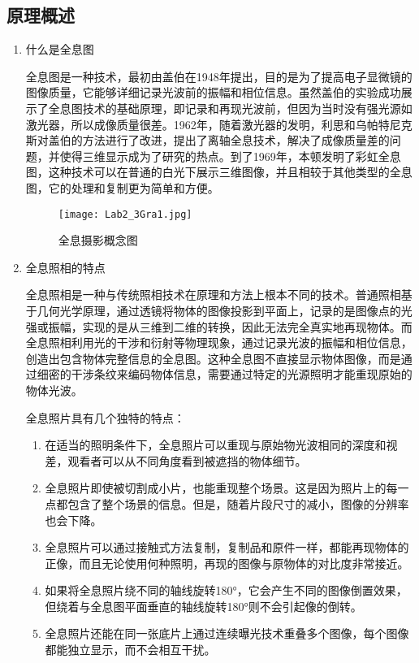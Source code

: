 \documentclass[dvipsnames, svgnames,a4paper,11pt]{article}
\begin{document}
	\subsection{原理概述}
	\begin{enumerate}
		\item 什么是全息图
		
		全息图是一种技术，最初由盖伯在1948年提出，目的是为了提高电子显微镜的图像质量，它能够详细记录光波前的振幅和相位信息。虽然盖伯的实验成功展示了全息图技术的基础原理，即记录和再现光波前，但因为当时没有强光源如激光器，所以成像质量很差。1962年，随着激光器的发明，利思和乌帕特尼克斯对盖伯的方法进行了改进，提出了离轴全息技术，解决了成像质量差的问题，并使得三维显示成为了研究的热点。到了1969年，本顿发明了彩虹全息图，这种技术可以在普通的白光下展示三维图像，并且相较于其他类型的全息图，它的处理和复制更为简单和方便。
		
		\begin{figure}[htbp]
			\centering
			\texttt{[image: Lab2\_3Gra1.jpg]}
			\caption{全息摄影概念图}
			\label{fig:fig1}
		\end{figure}
		
		\item 全息照相的特点
		
		全息照相是一种与传统照相技术在原理和方法上根本不同的技术。普通照相基于几何光学原理，通过透镜将物体的图像投影到平面上，记录的是图像点的光强或振幅，实现的是从三维到二维的转换，因此无法完全真实地再现物体。而全息照相利用光的干涉和衍射等物理现象，通过记录光波的振幅和相位信息，创造出包含物体完整信息的全息图。这种全息图不直接显示物体图像，而是通过细密的干涉条纹来编码物体信息，需要通过特定的光源照明才能重现原始的物体光波。
		
		全息照片具有几个独特的特点：
		\begin{enumerate}
			\item 在适当的照明条件下，全息照片可以重现与原始物光波相同的深度和视差，观看者可以从不同角度看到被遮挡的物体细节。
			\item 全息照片即使被切割成小片，也能重现整个场景。这是因为照片上的每一点都包含了整个场景的信息。但是，随着片段尺寸的减小，图像的分辨率也会下降。
			\item 全息照片可以通过接触式方法复制，复制品和原件一样，都能再现物体的正像，而且无论使用何种照明，再现的图像与原物体的对比度非常接近。
			\item 如果将全息照片绕不同的轴线旋转180°，它会产生不同的图像倒置效果，但绕着与全息图平面垂直的轴线旋转180°则不会引起像的倒转。
			\item 全息照片还能在同一张底片上通过连续曝光技术重叠多个图像，每个图像都能独立显示，而不会相互干扰。
		\end{enumerate}
		

\end{enumerate}
\end{document}
